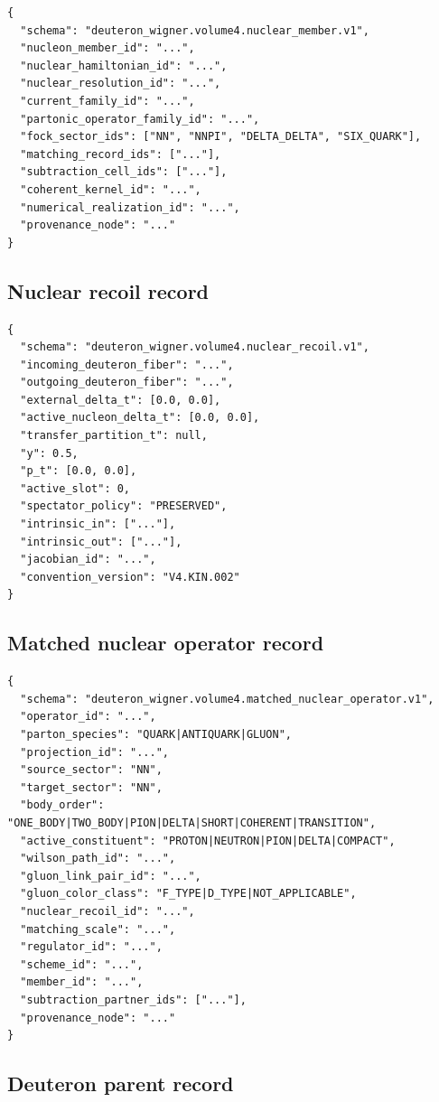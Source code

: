 \documentclass[11pt]{article}
\begin{document}
\begin{verbatim}
{
  "schema": "deuteron_wigner.volume4.nuclear_member.v1",
  "nucleon_member_id": "...",
  "nuclear_hamiltonian_id": "...",
  "nuclear_resolution_id": "...",
  "current_family_id": "...",
  "partonic_operator_family_id": "...",
  "fock_sector_ids": ["NN", "NNPI", "DELTA_DELTA", "SIX_QUARK"],
  "matching_record_ids": ["..."],
  "subtraction_cell_ids": ["..."],
  "coherent_kernel_id": "...",
  "numerical_realization_id": "...",
  "provenance_node": "..."
}
\end{verbatim}

\subsection{Nuclear recoil record}

\begin{verbatim}
{
  "schema": "deuteron_wigner.volume4.nuclear_recoil.v1",
  "incoming_deuteron_fiber": "...",
  "outgoing_deuteron_fiber": "...",
  "external_delta_t": [0.0, 0.0],
  "active_nucleon_delta_t": [0.0, 0.0],
  "transfer_partition_t": null,
  "y": 0.5,
  "p_t": [0.0, 0.0],
  "active_slot": 0,
  "spectator_policy": "PRESERVED",
  "intrinsic_in": ["..."],
  "intrinsic_out": ["..."],
  "jacobian_id": "...",
  "convention_version": "V4.KIN.002"
}
\end{verbatim}

\subsection{Matched nuclear operator record}

\begin{verbatim}
{
  "schema": "deuteron_wigner.volume4.matched_nuclear_operator.v1",
  "operator_id": "...",
  "parton_species": "QUARK|ANTIQUARK|GLUON",
  "projection_id": "...",
  "source_sector": "NN",
  "target_sector": "NN",
  "body_order": "ONE_BODY|TWO_BODY|PION|DELTA|SHORT|COHERENT|TRANSITION",
  "active_constituent": "PROTON|NEUTRON|PION|DELTA|COMPACT",
  "wilson_path_id": "...",
  "gluon_link_pair_id": "...",
  "gluon_color_class": "F_TYPE|D_TYPE|NOT_APPLICABLE",
  "nuclear_recoil_id": "...",
  "matching_scale": "...",
  "regulator_id": "...",
  "scheme_id": "...",
  "member_id": "...",
  "subtraction_partner_ids": ["..."],
  "provenance_node": "..."
}
\end{verbatim}

\subsection{Deuteron parent record}
\end{document}
